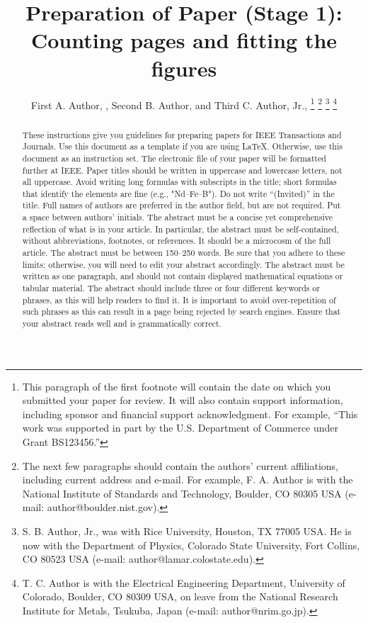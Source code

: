 \documentclass[journal,twoside,web]{ieeecolor2}
\begin{document}
\title{Preparation of Paper (Stage 1): Counting pages and fitting the figures}
\author{First A. Author, , Second B. Author, and Third C. Author, Jr., 
\thanks{This paragraph of the first footnote will contain the date on 
which you submitted your paper for review. It will also contain support 
information, including sponsor and financial support acknowledgment. For 
example, ``This work was supported in part by the U.S. Department of 
Commerce under Grant BS123456.'' }
\thanks{The next few paragraphs should contain 
the authors' current affiliations, including current address and e-mail. For 
example, F. A. Author is with the National Institute of Standards and 
Technology, Boulder, CO 80305 USA (e-mail: author@boulder.nist.gov). }
\thanks{S. B. Author, Jr., was with Rice University, Houston, TX 77005 USA. He is 
now with the Department of Physics, Colorado State University, Fort Collins, 
CO 80523 USA (e-mail: author@lamar.colostate.edu).}
\thanks{T. C. Author is with 
the Electrical Engineering Department, University of Colorado, Boulder, CO 
80309 USA, on leave from the National Research Institute for Metals, 
Tsukuba, Japan (e-mail: author@nrim.go.jp).}}

\maketitle

\begin{abstract}
These instructions give you guidelines for preparing papers for 
IEEE Transactions and Journals. Use this document as a template if you are 
using \LaTeX. Otherwise, use this document as an 
instruction set. The electronic file of your paper will be formatted further 
at IEEE. Paper titles should be written in uppercase and lowercase letters, 
not all uppercase. Avoid writing long formulas with subscripts in the title; 
short formulas that identify the elements are fine (e.g., "Nd--Fe--B"). Do 
not write ``(Invited)'' in the title. Full names of authors are preferred in 
the author field, but are not required. Put a space between authors' 
initials. The abstract must be a concise yet comprehensive reflection of 
what is in your article. In particular, the abstract must be self-contained, 
without abbreviations, footnotes, or references. It should be a microcosm of 
the full article. The abstract must be between 150--250 words. Be sure that 
you adhere to these limits; otherwise, you will need to edit your abstract 
accordingly. The abstract must be written as one paragraph, and should not 
contain displayed mathematical equations or tabular material. The abstract 
should include three or four different keywords or phrases, as this will 
help readers to find it. It is important to avoid over-repetition of such 
phrases as this can result in a page being rejected by search engines. 
Ensure that your abstract reads well and is grammatically correct.
\end{abstract}
\end{document}
